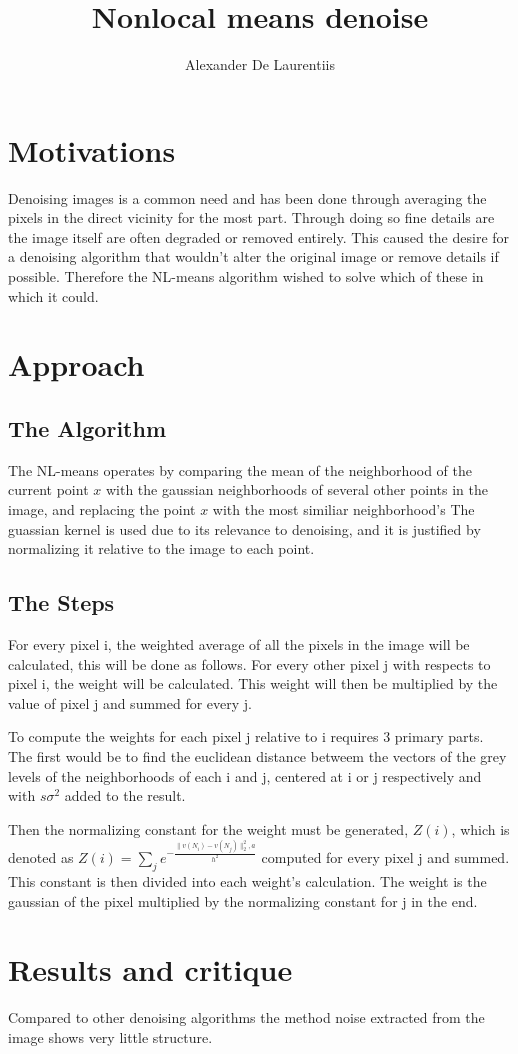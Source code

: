 \documentclass[12pt, letterpaper]{article}
\title{Nonlocal means denoise}
\author{Alexander De Laurentiis}
\begin{document}
\maketitle
\pagebreak

\section{Motivations}
Denoising images is a common need and has been done through averaging the pixels in the direct vicinity for the most part. Through doing so fine details are the image itself are often degraded or removed entirely. This caused the desire for a denoising algorithm that wouldn't alter the original image or remove details if possible. Therefore the NL-means algorithm wished to solve which of these in which it could.
\section{Approach}
\subsection{The Algorithm}
The NL-means operates by comparing the mean of the neighborhood of the current point $x$ with the gaussian neighborhoods of several other points in the image, and replacing the point $x$ with the most similiar neighborhood's The guassian kernel is used due to its relevance to denoising, and it is justified by normalizing it relative to the image to each point. 

\subsection{The Steps}
For every pixel i, the weighted average of all the pixels in the image will be calculated, this will be done as follows. For every other pixel j with respects to pixel i, the weight will be calculated. This weight will then be multiplied by the value of pixel j and summed for every j.

To compute the weights for each pixel j relative to i requires 3 primary parts. The first would be to find the euclidean distance betweem the vectors of the grey levels of the neighborhoods of each i and j, centered at i or j respectively and with $s\sigma^2$ added to the result.

Then the normalizing constant for the weight must be generated, $Z(i)$, which is denoted as $Z(i) = \sum_je^{-\frac{\|v(N_i)-v(N_j)\|_2^2,a}{h^2}}$ computed for every pixel j and summed. This constant is then divided into each weight's calculation. The weight is the gaussian of the pixel multiplied by the normalizing constant for j in the end.

\section{Results and critique}
Compared to other denoising algorithms the method noise extracted from the image shows very little structure.
\end{document}
